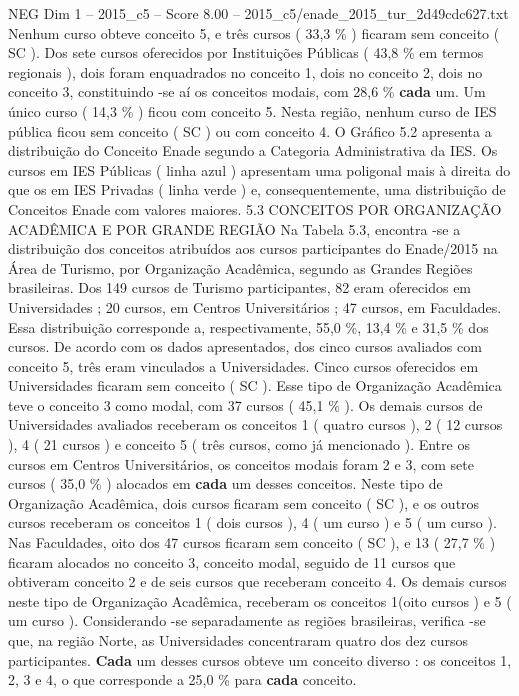 \begin{textsample}{NEG Dim 1 – 2015\_c5 – Score 8.00 – 2015\_c5/enade\_2015\_tur\_2d49cdc627.txt}
Nenhum curso obteve conceito 5, e três cursos ( 33,3 \% ) ficaram sem conceito ( SC ).
Dos sete cursos oferecidos por Instituições Públicas ( 43,8 \% em termos regionais ), dois foram enquadrados no conceito 1, dois no conceito 2, dois no conceito 3, constituindo -se aí os conceitos modais, com 28,6 \% \textbf{cada} um.
Um único curso ( 14,3 \% ) ficou com conceito 5.
Nesta região, nenhum curso de IES pública ficou sem conceito ( SC ) ou com conceito 4.
O Gráfico 5.2 apresenta a distribuição do Conceito Enade segundo a Categoria Administrativa da IES.
Os cursos em IES Públicas ( linha azul ) apresentam uma poligonal mais à direita do que os em IES Privadas ( linha verde ) e, consequentemente, uma distribuição de Conceitos Enade com valores maiores. 5.3 CONCEITOS POR ORGANIZAÇÃO ACADÊMICA E POR GRANDE REGIÃO Na Tabela 5.3, encontra -se a distribuição dos conceitos atribuídos aos cursos participantes do Enade/2015 na Área de Turismo, por Organização Acadêmica, segundo as Grandes Regiões brasileiras.
Dos 149 cursos de Turismo participantes, 82 eram oferecidos em Universidades ; 20 cursos, em Centros Universitários ; 47 cursos, em Faculdades.
Essa distribuição corresponde a, respectivamente, 55,0 \%, 13,4 \% e 31,5 \% dos cursos.
De acordo com os dados apresentados, dos cinco cursos avaliados com conceito 5, três eram vinculados a Universidades.
Cinco cursos oferecidos em Universidades ficaram sem conceito ( SC ).
Esse tipo de Organização Acadêmica teve o conceito 3 como modal, com 37 cursos ( 45,1 \% ).
Os demais cursos de Universidades avaliados receberam os conceitos 1 ( quatro cursos ), 2 ( 12 cursos ), 4 ( 21 cursos ) e conceito 5 ( três cursos, como já mencionado ).
Entre os cursos em Centros Universitários, os conceitos modais foram 2 e 3, com sete cursos ( 35,0 \% ) alocados em \textbf{cada} um desses conceitos.
Neste tipo de Organização Acadêmica, dois cursos ficaram sem conceito ( SC ), e os outros cursos receberam os conceitos 1 ( dois cursos ), 4 ( um curso ) e 5 ( um curso ).
Nas Faculdades, oito dos 47 cursos ficaram sem conceito ( SC ), e 13 ( 27,7 \% ) ficaram alocados no conceito 3, conceito modal, seguido de 11 cursos que obtiveram conceito 2 e de seis cursos que receberam conceito 4.
Os demais cursos neste tipo de Organização Acadêmica, receberam os conceitos 1(oito cursos ) e 5 ( um curso ).
Considerando -se separadamente as regiões brasileiras, verifica -se que, na região Norte, as Universidades concentraram quatro dos dez cursos participantes. \textbf{Cada} um desses cursos obteve um conceito diverso : os conceitos 1, 2, 3 e 4, o que corresponde a 25,0 \% para \textbf{cada} conceito.

\end{textsample}
